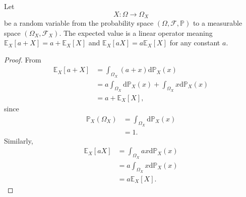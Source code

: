 \begin{theorem}
	\label{theorem:exp_linear}
	Let 
	\begin{equation}
		X\colon \Omega \to \Omega_X
	\end{equation}
	be a random variable from the probability space $(\Omega, \mathcal{F}, \mathbb{P})$ to a measurable space $(\Omega_X, \mathcal{F}_X)$. The expected value is a linear operator meaning $\mathbb{E}_X[a+X] = a+\mathbb{E}_X[X]$ and $\mathbb{E}_X[aX] = a\mathbb{E}_X[X]$ for any constant $a$.
\end{theorem}
\begin{proof}
	From  
	\begin{equation}
		\begin{split}
			\mathbb{E}_X[a + X] &= \int_{\Omega_X}(a + x) \mathrm{d}\mathbb{P}_X(x) \\ 
			&= a\int_{\Omega_X} \mathrm{d}\mathbb{P}_X(x) + \int_{\Omega_X} x \mathrm{d}\mathbb{P}_X(x)\\
			&= a + \mathbb{E}_X[X],
		\end{split}
	\end{equation}
	since 
	\begin{equation}
		\begin{split}
			\mathbb{P}_X(\Omega_X) &= \int_{\Omega_X} \mathrm{d}\mathbb{P}_X(x) \\
			& = 1.
		\end{split}
	\end{equation}
	Similarly,
	\begin{equation}
		\begin{split}
			\mathbb{E}_X[a X] &= \int_{\Omega_X} a x \mathrm{d}\mathbb{P}_X(x) \\
			& = a \int_{\Omega_X} x \mathrm{d}\mathbb{P}_X(x)\\
			& = a \mathbb{E}_X[X].
		\end{split}
	\end{equation}
\end{proof}


